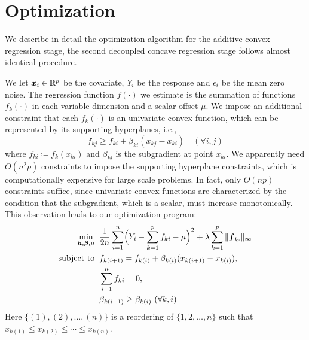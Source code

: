 \section{Optimization}
\label{sec:optimization}

We describe in detail the optimization algorithm for the additive convex regression stage, the second decoupled concave regression stage follows almost identical procedure. 

We let $\boldsymbol{x}_{i}\in\mathbb{R}^{p}$ be the covariate, $Y_{i}$ be the
response and $\epsilon_{i}$ be the mean zero noise. The regression function $f(\cdot)$ we estimate is the summation of 
functions $f_{k}(\cdot)$ in each variable dimension and a scalar offset $\mu$.  
We impose an additional constraint that each $f_{k}(\cdot)$ is 
an univariate convex function, which can be represented by its supporting hyperplanes, i.e.,
\begin{equation}\label{hyper}
      f_{kj} \geq f_{ki} + \beta_{ki}(x_{kj}-x_{ki}) \quad (\forall i,j)
\end{equation}
where $f_{ki}\coloneqq f_{k}(x_{ki})$ and $\beta_{ki}$ is the
subgradient at point $x_{ki}$. We apparently need $O(n^2 p)$ constraints to
impose the supporting hyperplane constraints, which is computationally
expensive for large scale problems.  In fact, only $O(np)$
constraints suffice, since univariate convex functions are
characterized by the condition that the subgradient, which is a scalar, must
increase monotonically. This observation leads to our optimization
program:
\begin{equation}
\begin{split}
       \min_{\bds{h},\bds{\beta},\mu} & \;\; \frac{1}{2n}\sum_{i=1}^{n}
                     \Bigl( Y_{i}-\sum_{k=1}^{p}f_{ki} - \mu \Bigr)^{2} 
                         + \lambda\sum_{k=1}^{p}\|\bds{f}_{k\cdot}\|_{\infty} \\
       \textrm{subject to} &\;\; f_{k(i+1)} = f_{k(i)} + \beta_{k(i)}(x_{k(i+1)}-x_{k(i)}), \\
                     & \;\; \sum_{i=1}^{n}f_{ki}=0,\\
                     & \;\; \beta_{k(i+1)} \geq \beta_{k(i)} \ (\forall k, i)
\end{split}
\label{np}
\end{equation}
Here $\{(1),(2),\ldots,(n)\}$ is a reordering of $\{1,2,\ldots,n\}$ such that $x_{k(1)}\leq{}x_{k(2)}\leq\cdots\leq{}x_{k(n)}$. 


